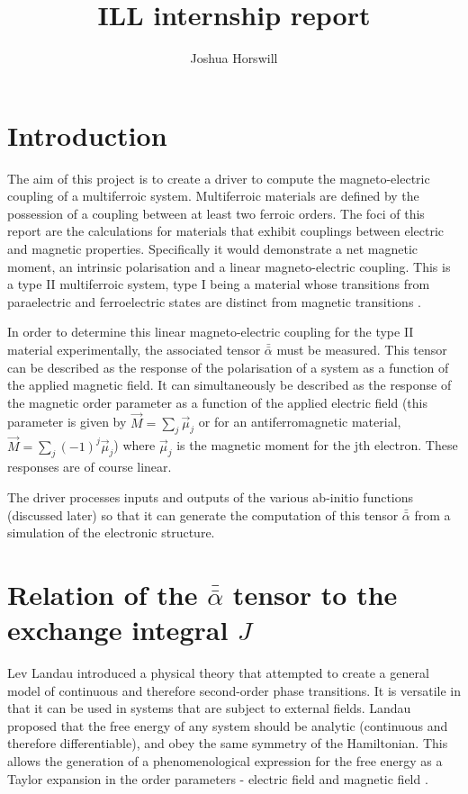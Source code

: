 \documentclass[10pt]{article}
\author{Joshua Horswill}
\title{ILL internship report}
\begin{document}
\maketitle
\tableofcontents
\newpage
\section{Introduction}
The aim of this project is to create a driver to compute the magneto-electric coupling of a multiferroic system. Multiferroic materials are defined by the possession of a coupling between at least two ferroic orders. The foci of this report are the calculations for materials that exhibit couplings between electric and magnetic properties. Specifically it would demonstrate a net magnetic moment, an intrinsic polarisation and a linear magneto-electric coupling. This is a type II multiferroic system, type I being a material whose transitions from paraelectric and ferroelectric states are distinct from magnetic transitions \cite{Hur2004}\cite{goto2004ferroelectricity}.

In order to determine this linear magneto-electric coupling for the type II material experimentally, the associated tensor $\bar{\bar{\alpha}}$ must be measured. This tensor can be described as the response of the polarisation of a system as a function of the applied magnetic field. It can simultaneously be described as the response of the magnetic order parameter as a function of the applied electric field (this parameter is given by $\vec{M} = \sum_j \vec{\mu}_j$ or for an antiferromagnetic material, $\vec{M} = \sum_j (-1)^j \vec{\mu}_j$) where $\vec{\mu}_j$ is the magnetic moment for the jth electron. These responses are of course linear.

The driver processes inputs and outputs of the various ab-initio functions (discussed later) so that it can generate the computation of this tensor $\bar{\bar{\alpha}}$ from a simulation of the electronic structure.

\section{Relation of the $\bar{\bar{\alpha}}$ tensor to the exchange integral $J$}

Lev Landau introduced a physical theory that attempted to create a general model of continuous and therefore second-order phase transitions. It is versatile in that it can be used in systems that are subject to external fields. Landau proposed that the free energy of any system should be analytic (continuous and therefore differentiable), and obey the same symmetry of the Hamiltonian. This allows the generation of a phenomenological expression for the free energy as a Taylor expansion in the order parameters - electric field and magnetic field \cite{landau1936theory}.
\end{document}
